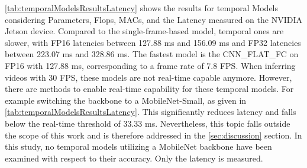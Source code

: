 \autoref{tab:temporalModelsResultsLatency} shows the results for temporal Models considering Parameters, Flops, MACs, and the Latency measured on the NVIDIA Jetson device.
Compared to the single-frame-based model, temporal ones are slower, with FP16 latencies between 127.88 ms and 156.09 ms and FP32 latencies between 223.07 ms and 328.86 ms.
The fastest model is the CNN\_FLAT\_FC on FP16 with 127.88 ms, corresponding to a frame rate of 7.8 \ac{FPS}.
When inferring videos with 30 \ac{FPS}, these models are not real-time capable anymore.
However, there are methods to enable real-time capability for these temporal models.
For example switching the backbone to a MobileNet-Small, as given in \autoref{tab:temporalModelsResultsLatency}.
This significantly reduces latency and falls below the real-time threshold of 33.33 ms.
Nevertheless, this topic falls outside the scope of this work and is therefore addressed in the \autoref{sec:discussion} section.
In this study, no temporal models utilizing a MobileNet backbone have been examined with respect to their accuracy.
Only the latency is measured.